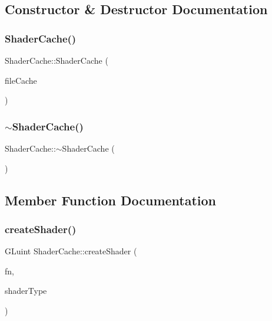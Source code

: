 \subsection{Constructor \& Destructor Documentation}
\mbox{\label{classsage_1_1ShaderCache_a9977d4b3bae3c36778d0a6f0fd73bc2e}} 
\subsubsection{\texorpdfstring{ShaderCache()}{ShaderCache()}}
{\footnotesize\ttfamily Shader\+Cache\+::\+Shader\+Cache (\begin{DoxyParamCaption}\item[{\mbox{\hyperlink{classsage_1_1FileCache}{File\+Cache}} $\ast$}]{file\+Cache }\end{DoxyParamCaption})}

\mbox{\label{classsage_1_1ShaderCache_a060caa88a1718dddc0800aa552ac4a41}} 
\subsubsection{\texorpdfstring{$\sim$ShaderCache()}{~ShaderCache()}}
{\footnotesize\ttfamily Shader\+Cache\+::$\sim$\+Shader\+Cache (\begin{DoxyParamCaption}{ }\end{DoxyParamCaption})}



\subsection{Member Function Documentation}
\mbox{\label{classsage_1_1ShaderCache_a6faed61c708a429ddb246855707c8596}} 
\subsubsection{\texorpdfstring{createShader()}{createShader()}}
{\footnotesize\ttfamily G\+Luint Shader\+Cache\+::create\+Shader (\begin{DoxyParamCaption}\item[{const std\+::string \&}]{fn,  }\item[{G\+Lenum}]{shader\+Type }\end{DoxyParamCaption})\hspace{0.3cm}{\ttfamily [private]}}

